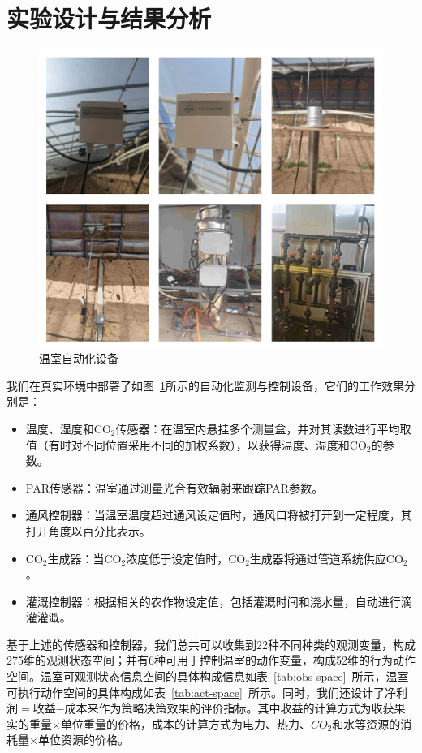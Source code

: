 \section{实验设计与结果分析}

\begin{figure}
\centering
\includegraphics[width=\textwidth]{figures/devices.png}
\caption{温室自动化设备}
\label{fig:devices}
\end{figure}

我们在真实环境中部署了如图~\ref{fig:devices}所示的自动化监测与控制设备，它们的工作效果分别是：

\begin{itemize}
    \item 温度、湿度和CO$_2$传感器：在温室内悬挂多个测量盒，并对其读数进行平均取值（有时对不同位置采用不同的加权系数），以获得温度、湿度和CO$_2$的参数。
    \item PAR传感器：温室通过测量光合有效辐射来跟踪PAR参数。
    \item 通风控制器：当温室温度超过通风设定值时，通风口将被打开到一定程度，其打开角度以百分比表示。
    \item CO$_2$生成器：当CO$_2$浓度低于设定值时，CO$_2$生成器将通过管道系统供应CO$_2$。
    \item 灌溉控制器：根据相关的农作物设定值，包括灌溉时间和浇水量，自动进行滴灌灌溉。
\end{itemize}

基于上述的传感器和控制器，我们总共可以收集到22种不同种类的观测变量，构成275维的观测状态空间；并有6种可用于控制温室的动作变量，构成52维的行为动作空间。温室可观测状态信息空间的具体构成信息如表~\ref{tab:obs-space}~所示，温室可执行动作空间的具体构成如表~\ref{tab:act-space}~所示。同时，我们还设计了净利润$=$收益$-$成本来作为策略决策效果的评价指标。其中收益的计算方式为收获果实的重量$\times$单位重量的价格，成本的计算方式为电力、热力、$CO_2$和水等资源的消耗量$\times$单位资源的价格。

